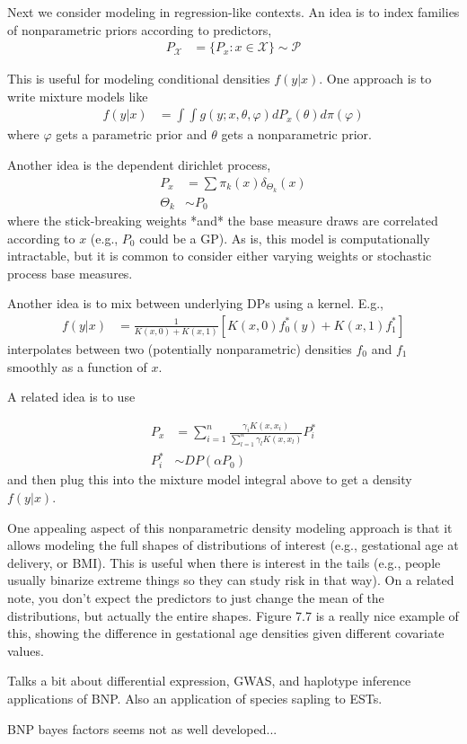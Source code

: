 \documentclass{article}
\begin{document}
Next we consider modeling in regression-like contexts. An idea is to index
families of nonparametric priors according to predictors,
\begin{align}
P_{\mathcal{X}} &= \{P_{x} : x \in \mathcal{X}\} \sim \mathcal{P}
\end{align}

This is useful for modeling conditional densities $f\left(y \vert x\right)$.
One approach is to write mixture models like
\begin{align}
f\left(y \vert x\right) &= \int \int g\left(y; x, \theta, \varphi\right)dP_{x}\left(\theta\right) d\pi\left(\varphi\right)
\end{align}
where $\varphi$ gets a parametric prior and $\theta$ gets a nonparametric prior.

Another idea is the dependent dirichlet process,
\begin{align}
  P_{x} &= \sum \pi_{k}\left(x\right)\delta_{\Theta_{k}}\left(x\right) \\
  \Theta_{k} &\sim P_{0}
\end{align}
where the stick-breaking weights *and* the base measure draws are correlated
according to $x$ (e.g., $P_{0}$ could be a GP). As is, this model is
computationally intractable, but it is common to consider either varying weights
or stochastic process base measures.

Another idea is to mix between underlying DPs using a kernel. E.g.,
\begin{align}
f\left(y \vert x\right) &= \frac{1}{K\left(x, 0\right) + K\left(x, 1\right)}\left[K\left(x, 0\right)f_{0}^{\ast}\left(y\right) + K\left(x, 1\right)f_{1}^{\ast}\right]
\end{align}
interpolates between two (potentially nonparametric) densities $f_{0}$ and
$f_{1}$ smoothly as a function of $x$.

A related idea is to use

\begin{align}
  P_{x} &= \sum_{i = 1}^{n} \frac{\gamma_{i}K\left(x, x_{i}\right)}{\sum_{l = 1}^{n} \gamma_{l}K\left(x, x_{l}\right)} P_{i}^{\ast} \\
  P_{i}^{\ast} &\sim DP\left(\alpha P_{0}\right)
\end{align}
and then plug this into the mixture model integral above to get a density
$f\left(y \vert x\right)$.

One appealing aspect of this nonparametric density modeling approach is that it
allows modeling the full shapes of distributions of interest (e.g., gestational
age at delivery, or BMI). This is useful when there is interest in the tails
(e.g., people usually binarize extreme things so they can study risk in that
way). On a related note, you don't expect the predictors to just change the mean
of the distributions, but actually the entire shapes. Figure 7.7 is a really
nice example of this, showing the difference in gestational age densities given
different covariate values.

Talks a bit about differential expression, GWAS, and haplotype inference
applications of BNP. Also an application of species sapling to ESTs.

BNP bayes factors seems not as well developed...
\end{document}
